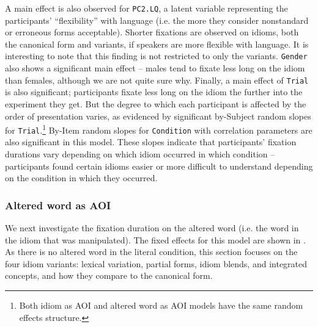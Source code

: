 \documentclass[output=paper,modfonts,nonflat]{langsci/langscibook}
\begin{document}
\largerpage
A main effect is also observed for \texttt{PC2.LQ}, a latent variable representing the participants' ``flexibility'' with language (i.e. the more they consider nonstandard or erroneous forms acceptable). Shorter fixations are observed on idioms, both the canonical form and variants, if speakers are more flexible with language. It is interesting to note that this finding is not  restricted to only the variants. \texttt{Gender} also shows a significant main effect -- males tend to fixate less long on the idiom than females, although we are not quite sure why. Finally, a main effect of \texttt{Trial} is also significant; participants fixate less long on the idiom the further into the experiment they get. But the degree to which each participant is affected by the order of presentation varies, as evidenced by significant by-Subject random slopes for \texttt{Trial}.\footnote{Both idiom as AOI and altered word as AOI models have the same random effects structure.} By-Item random slopes for \texttt{Condition} with correlation parameters are also significant in this model. These slopes indicate that participants' fixation durations vary depending on which idiom occurred in which condition -- participants found certain idioms easier or more difficult to understand depending on the condition in which they occurred. 



\subsubsection{Altered word as AOI}

We next investigate the fixation duration on the altered word (i.e. the word in the idiom that was manipulated). The fixed effects for this model are shown in . As there is no altered word in the literal condition, this section focuses on the four idiom variants: lexical variation, partial forms, idiom blends, and integrated concepts, and how they compare to the canonical form. 
\end{document}
